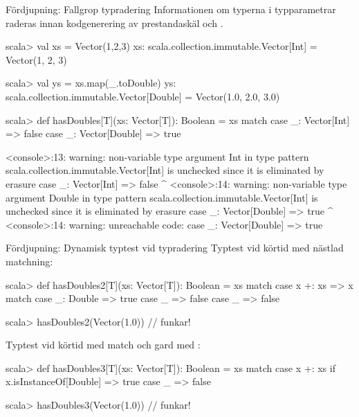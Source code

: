 \begin{Slide}{Fördjupning: Fallgrop typradering }\SlideFontSmall
Informationen om typerna i typparametrar raderas innan kodgenerering av prestandaskäl och .
\vspace{-0.25em}\begin{REPL}
scala> val xs = Vector(1,2,3)
xs: scala.collection.immutable.Vector[Int] = Vector(1, 2, 3)

scala> val ys = xs.map(_.toDouble)
ys: scala.collection.immutable.Vector[Double] = Vector(1.0, 2.0, 3.0)

scala> def hasDoubles[T](xs: Vector[T]): Boolean = xs match {
         case _: Vector[Int] => false
         case _: Vector[Double] => true
       }

<console>:13: warning: non-variable type argument Int in type pattern scala.collection.immutable.Vector[Int]
is unchecked since it is eliminated by erasure
                case _: Vector[Int] => false
                        ^
<console>:14: warning: non-variable type argument Double in type pattern scala.collection.immutable.Vector[Int]
is unchecked since it is eliminated by erasure
                case _: Vector[Double] => true
                        ^
<console>:14: warning: unreachable code: case _: Vector[Double] => true
\end{REPL}
\end{Slide}

\begin{Slide}{Fördjupning: Dynamisk typtest vid typradering}\SlideFontSmall
Typtest vid körtid med nästlad matchning:
\begin{REPL}
scala> def hasDoubles2[T](xs: Vector[T]): Boolean = xs match {
         case x +: xs => x match { 
           case _: Double => true
           case _ => false
         }  
         case _ => false
       }

scala> hasDoubles2(Vector(1.0))    // funkar!
\end{REPL}

Typtest vid körtid med match och gard med :
\begin{REPL}
       
scala> def hasDoubles3[T](xs: Vector[T]): Boolean = xs match {
         case x +: xs if x.isInstanceOf[Double] => true
         case _ => false
       }

scala> hasDoubles3(Vector(1.0))    // funkar!
       
       
\end{REPL}
\end{Slide}


